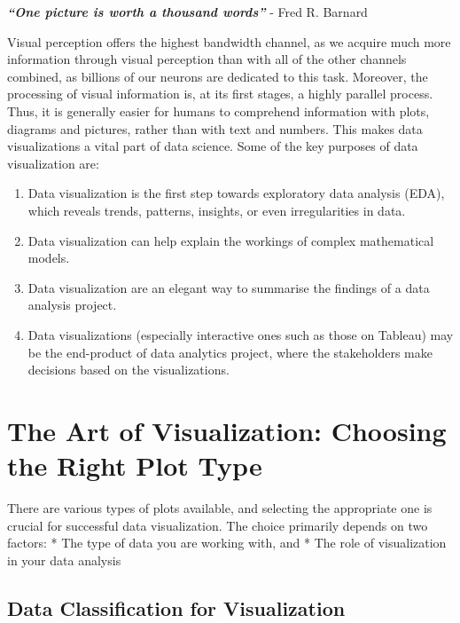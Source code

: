 \documentclass[
  letterpaper,
  DIV=11,
  numbers=noendperiod]{scrreprt}
\providecommand{\tightlist}{%
  \setlength{\itemsep}{0pt}\setlength{\parskip}{0pt}}\usepackage{longtable,booktabs,array}
\begin{document}
\textbf{\emph{``One picture is worth a thousand words''}} - Fred R.
Barnard

Visual perception offers the highest bandwidth channel, as we acquire
much more information through visual perception than with all of the
other channels combined, as billions of our neurons are dedicated to
this task. Moreover, the processing of visual information is, at its
first stages, a highly parallel process. Thus, it is generally easier
for humans to comprehend information with plots, diagrams and pictures,
rather than with text and numbers. This makes data visualizations a
vital part of data science. Some of the key purposes of data
visualization are:

\begin{enumerate}
\def\labelenumi{\arabic{enumi}.}
\tightlist
\item
  Data visualization is the first step towards exploratory data analysis
  (EDA), which reveals trends, patterns, insights, or even
  irregularities in data.
\item
  Data visualization can help explain the workings of complex
  mathematical models.
\item
  Data visualization are an elegant way to summarise the findings of a
  data analysis project.
\item
  Data visualizations (especially interactive ones such as those on
  Tableau) may be the end-product of data analytics project, where the
  stakeholders make decisions based on the visualizations.
\end{enumerate}

\hypertarget{the-art-of-visualization-choosing-the-right-plot-type}{%
\section{The Art of Visualization: Choosing the Right Plot
Type}\label{the-art-of-visualization-choosing-the-right-plot-type}}

There are various types of plots available, and selecting the
appropriate one is crucial for successful data visualization. The choice
primarily depends on two factors: * The type of data you are working
with, and * The role of visualization in your data analysis

\hypertarget{data-classification-for-visualization}{%
\subsection{Data Classification for
Visualization}\label{data-classification-for-visualization}}
\end{document}
